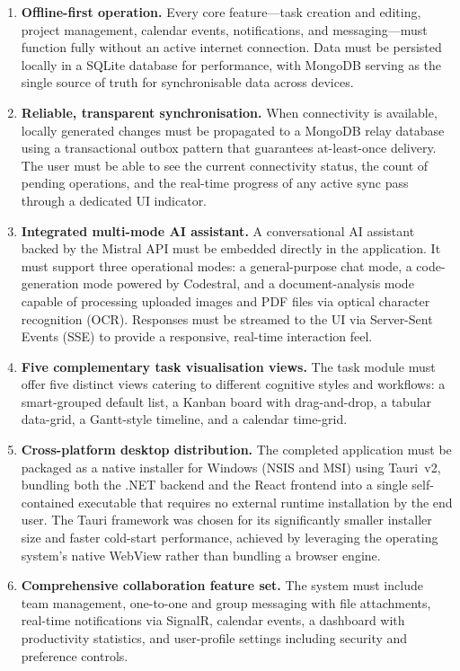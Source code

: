 \begin{enumerate}
    \item \textbf{Offline-first operation.}
          Every core feature---task creation and editing, project management, calendar
          events, notifications, and messaging---must function fully without an active
          internet connection.
Data must be persisted locally in a SQLite database for performance, with MongoDB
serving as the single source of truth for synchronisable data across devices.

    \item \textbf{Reliable, transparent synchronisation.}
          When connectivity is available, locally generated changes must be propagated to
          a MongoDB relay database using a transactional outbox pattern that guarantees
          at-least-once delivery.
          The user must be able to see the current connectivity status, the count of
          pending operations, and the real-time progress of any active sync pass through
          a dedicated UI indicator.

    \item \textbf{Integrated multi-mode AI assistant.}
          A conversational AI assistant backed by the Mistral API must be embedded
          directly in the application.
          It must support three operational modes: a general-purpose chat mode, a
          code-generation mode powered by Codestral, and a document-analysis mode
          capable of processing uploaded images and PDF files via optical character
          recognition (OCR).
          Responses must be streamed to the UI via Server-Sent Events (SSE) to provide
          a responsive, real-time interaction feel.

    \item \textbf{Five complementary task visualisation views.}
          The task module must offer five distinct views catering to different cognitive
          styles and workflows: a smart-grouped default list, a Kanban board with
          drag-and-drop, a tabular data-grid, a Gantt-style timeline, and a calendar
          time-grid.

    \item \textbf{Cross-platform desktop distribution.}
          The completed application must be packaged as a native installer for
          Windows (NSIS and MSI) using Tauri~v2, bundling both the .NET backend and
          the React frontend into a single self-contained executable that requires
          no external runtime installation by the end user.
          The Tauri framework was chosen for its significantly smaller installer size
          and faster cold-start performance, achieved by leveraging the operating
          system's native WebView rather than bundling a browser engine.

    \item \textbf{Comprehensive collaboration feature set.}
          The system must include team management, one-to-one and group messaging with
          file attachments, real-time notifications via SignalR, calendar events,
          a dashboard with productivity statistics, and user-profile settings including
          security and preference controls.
\end{enumerate}

